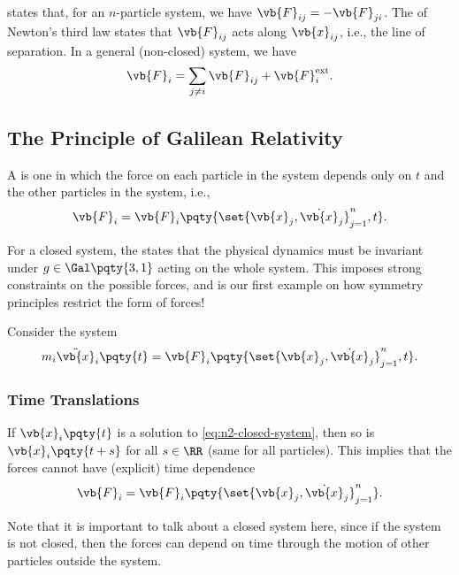  states that, for an \(n\)-particle system, we have \(\vb{F}_{ij} = - \vb{F}_{ji}\). The  of Newton's third law states that \(\vb{F}_{ij}\) acts along \(\vb{x}_{ij}\), i.e., the line of separation. In a general (non-closed) system, we have
\begin{equation}
    \vb{F}_i = \sum_{j \neq i} \vb{F}_{ij} + \vb{F}_{i}^{\text{ext}}.
\end{equation}

\subsection{The Principle of Galilean Relativity}

A  is one in which the force on each particle in the system depends only on \(t\) and the other particles in the system, i.e., 
\begin{equation}
    \vb{F}_i = \vb{F}_i \pqty{\set{\vb{x}_j, \dot{\vb{x}}_j}_{j = 1}^{n}, t}.
\end{equation}

For a closed system, the  states that the physical dynamics must be invariant under \(g \in \Gal\pqty{3, 1}\) acting on the whole system. This imposes strong constraints on the possible forces, and is our first example on how symmetry principles restrict the form of forces!

Consider the system
\begin{equation}
    \label{eq:n2-closed-system}%
    m_i \ddot{\vb{x}}_i \pqty{t} = \vb{F}_i \pqty{\set{\vb{x}_j, \dot{\vb{x}}_j}_{j = 1}^{n}, t}.
\end{equation}

\subsubsection{Time Translations}

If \(\vb{x}_i \pqty{t}\) is a solution to \eqref{eq:n2-closed-system}, then so is \(\vb{x}_i \pqty{t + s}\) for all \(s \in \RR\) (same for all particles). This implies that the forces cannot have (explicit) time dependence
\begin{equation}
    \vb{F}_i = \vb{F}_i \pqty{\set{\vb{x}_j, \dot{\vb{x}}_j}_{j = 1}^{n}}.
\end{equation}

Note that it is important to talk about a closed system here, since if the system is not closed, then the forces can depend on time through the motion of other particles outside the system.

